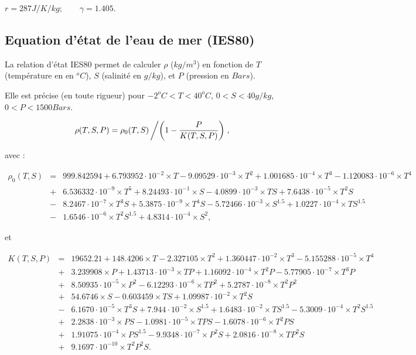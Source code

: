 $ r = 287 J/K/kg ; \qquad \gamma = 1.405$.


\subsection{Equation d'état de l'eau de mer (IES80)}

La relation d'état IES80 permet  de calculer $\rho$ ($kg /m^3$) en fonction
de $T$ (température en  en $^o C$), $S$ (salinité en $g/kg$), et $P$ (pression en $Bars$). 

Elle est précise (en toute rigueur) pour $-2^oC<T < 40^o C$, $0<S<40g/kg$, 
$0<P<1500 Bars$.

\vspace{.5cm}

{
\tiny

$$
\rho(T,S,P) = \rho_0(T,S) \left/ \left( 1 - \frac{P}{K(T,S,P)} \right) \right.,
$$

avec :

\begin{eqnarray*}
\rho_0(T,S) &=& 999.842594+6.793952\cdot 10^{-2} \times T-9.09529\cdot 10^{-3} \times T^2+1.001685\cdot 10^{-4} \times T^3 -1.120083\cdot 10^{-6} \times T^4 \\
            &+& 6.536332\cdot 10^{-9} \times T^5+8.24493\cdot 10^{-1} \times S-4.0899\cdot 10^{-3} \times T S+7.6438\cdot 10^{-5} \times T^2 S \\
	    &-&8.2467\cdot 10^{-7} \times T^3 S + 5.3875\cdot 10^{-9} \times T^4 S-5.72466\cdot 10^{-3} \times S^{1.5}+1.0227\cdot 10^{-4} \times T S^{1.5}\\
	    &-&1.6546\cdot 10^{-6} \times T^2 S^{1.5}+4.8314\cdot 10^{-4} \times S^2, 
\end{eqnarray*}

et 

\begin{eqnarray*}
K(T,S,P) &=& 19652.21+148.4206 \times T-2.327105 \times T^2+1.360447\cdot 10^{-2} \times T^3-5.155288\cdot 10^{-5} \times T^4 \\
         &+&3.239908 \times P+1.43713\cdot 10^{-3} \times T P+1.16092\cdot 10^{-4} \times T^2 P-5.77905\cdot 10^{-7} \times T^3 P \\
         &+&8.50935\cdot 10^{-5} \times P^2-6.12293\cdot 10^{-6} \times T P^2+5.2787\cdot 10^{-8} \times T^2 P^2 \\
         &+&54.6746 \times S-0.603459 \times T S+1.09987\cdot 10^{-2} \times T^2 S \\
         &-&6.1670\cdot 10^{-5} \times T^3 S+7.944\cdot 10^{-2} \times S^{1.5}+1.6483\cdot 10^{-2} \times T S^{1.5}-5.3009\cdot 10^{-4} \times T^2 S^{1.5} \\
         &+&2.2838\cdot 10^{-3} \times P S-1.0981\cdot 10^{-5} \times T P S-1.6078\cdot 10^{-6} \times T^2 P S \\
	 &+&1.91075\cdot 10^{-4} \times P  S^{1.5}-9.9348\cdot 10^{-7} \times P^2 S+2.0816\cdot 10^{-8} \times T P^2 S \\
	 &+&9.1697\cdot 10^{-10} \times T^2 P^2 S.
\end{eqnarray*}

}



